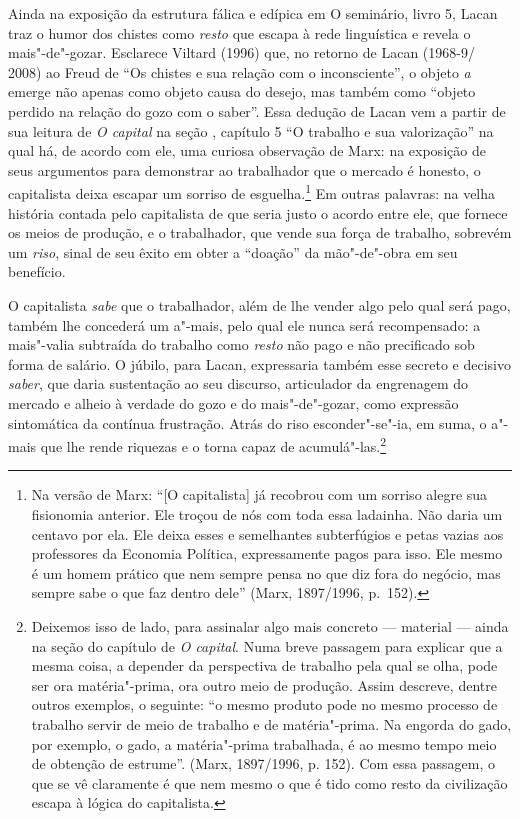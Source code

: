 Ainda na exposição da estrutura fálica e edípica em O seminário, livro
5, Lacan traz o humor dos chistes como \emph{resto} que escapa à rede
linguística e revela o mais"-de"-gozar. Esclarece Viltard (1996) que, no
retorno de Lacan (1968-9/ 2008) ao Freud de ``Os chistes e sua relação
com o inconsciente'', o objeto \emph{a} emerge não apenas como objeto
causa do desejo, mas também como ``objeto perdido na relação do gozo com
o saber''. Essa dedução de Lacan vem a partir de sua leitura de \emph{O
capital} na seção , capítulo 5 ``O trabalho e sua valorização'' na
qual há, de acordo com ele, uma curiosa observação de Marx: na exposição
de seus argumentos para demonstrar ao trabalhador que o mercado é
honesto, o capitalista deixa escapar um sorriso de esguelha.\footnote{Na
  versão de Marx: ``{[}O capitalista{]} já recobrou com um sorriso
  alegre sua fisionomia anterior. Ele troçou de nós com toda essa
  ladainha. Não daria um centavo por ela. Ele deixa esses e semelhantes
  subterfúgios e petas vazias aos professores da Economia Política,
  expressamente pagos para isso. Ele mesmo é um homem prático que nem
  sempre pensa no que diz fora do negócio, mas sempre sabe o que faz
  dentro dele'' (Marx, 1897/1996, p.~152).} Em outras palavras: na
velha história contada pelo capitalista de que seria justo o acordo
entre ele, que fornece os meios de produção, e o trabalhador, que vende
sua força de trabalho, sobrevém um \emph{riso}, sinal de seu êxito em
obter a ``doação'' da mão"-de"-obra em seu benefício.

O capitalista \emph{sabe} que o trabalhador, além de lhe vender algo
pelo qual será pago, também lhe concederá um a"-mais, pelo qual ele nunca
será recompensado: a mais"-valia subtraída do trabalho como \emph{resto}
não pago e não precificado sob forma de salário. O júbilo, para Lacan,
expressaria também esse secreto e decisivo \emph{saber}, que daria
sustentação ao seu discurso, articulador da engrenagem do mercado e
alheio à verdade do gozo e do mais"-de"-gozar, como expressão sintomática
da contínua frustração. Atrás do riso esconder"-se"-ia, em suma, o a"-mais
que lhe rende riquezas e o torna capaz de acumulá"-las.\footnote{Deixemos
  isso de lado, para assinalar algo mais concreto --- material --- ainda
  na seção  do capítulo  de \emph{O capital}. Numa breve passagem
  para explicar que a mesma coisa, a depender da perspectiva de trabalho
  pela qual se olha, pode ser ora matéria"-prima, ora outro meio de
  produção. Assim descreve, dentre outros exemplos, o seguinte: ``o
  mesmo produto pode no mesmo processo de trabalho servir de meio de
  trabalho e de matéria"-prima. Na engorda do gado, por exemplo, o gado,
  a matéria"-prima trabalhada, é ao mesmo tempo meio de obtenção de
  estrume''. (Marx, 1897/1996, p. 152). Com essa passagem, o que se vê
  claramente é que nem mesmo o que é tido como resto da civilização
  escapa à lógica do capitalista.}


